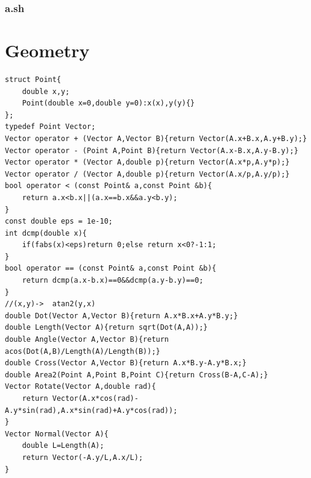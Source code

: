 \documentclass[twoside]{article}
\begin{document}
\subsubsection{a.sh}
\clearpage\section{Geometry}
\begin{lstlisting}
struct Point{
    double x,y;
    Point(double x=0,double y=0):x(x),y(y){}
};
typedef Point Vector;
Vector operator + (Vector A,Vector B){return Vector(A.x+B.x,A.y+B.y);}
Vector operator - (Point A,Point B){return Vector(A.x-B.x,A.y-B.y);}
Vector operator * (Vector A,double p){return Vector(A.x*p,A.y*p);}
Vector operator / (Vector A,double p){return Vector(A.x/p,A.y/p);}
bool operator < (const Point& a,const Point &b){
    return a.x<b.x||(a.x==b.x&&a.y<b.y);
}
const double eps = 1e-10;
int dcmp(double x){
    if(fabs(x)<eps)return 0;else return x<0?-1:1;
}
bool operator == (const Point& a,const Point &b){
    return dcmp(a.x-b.x)==0&&dcmp(a.y-b.y)==0;
}
//(x,y)->  atan2(y,x)
double Dot(Vector A,Vector B){return A.x*B.x+A.y*B.y;}
double Length(Vector A){return sqrt(Dot(A,A));}
double Angle(Vector A,Vector B){return acos(Dot(A,B)/Length(A)/Length(B));}
double Cross(Vector A,Vector B){return A.x*B.y-A.y*B.x;}
double Area2(Point A,Point B,Point C){return Cross(B-A,C-A);}
Vector Rotate(Vector A,double rad){
    return Vector(A.x*cos(rad)-A.y*sin(rad),A.x*sin(rad)+A.y*cos(rad));
}
Vector Normal(Vector A){
    double L=Length(A);
    return Vector(-A.y/L,A.x/L);
}
\end{lstlisting}
\end{document}

